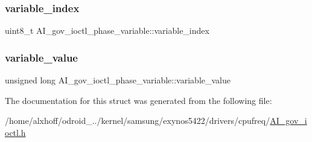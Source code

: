 \subsubsection{\texorpdfstring{variable\+\_\+index}{variable\_index}}
{\footnotesize\ttfamily uint8\+\_\+t A\+I\+\_\+gov\+\_\+ioctl\+\_\+phase\+\_\+variable\+::variable\+\_\+index}

\mbox{\label{structAI__gov__ioctl__phase__variable_a6414166476d3b31d73f08c744cbfbf78}} 
\subsubsection{\texorpdfstring{variable\+\_\+value}{variable\_value}}
{\footnotesize\ttfamily unsigned long A\+I\+\_\+gov\+\_\+ioctl\+\_\+phase\+\_\+variable\+::variable\+\_\+value}



The documentation for this struct was generated from the following file\+:\begin{DoxyCompactItemize}
\item 
/home/alxhoff/odroid\+\_../kernel/samsung/exynos5422/drivers/cpufreq/\hyperlink{AI__gov__ioctl_8h}{A\+I\+\_\+gov\+\_\+ioctl.\+h}\end{DoxyCompactItemize}
